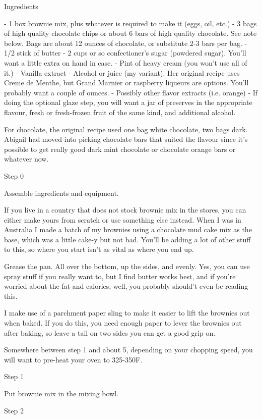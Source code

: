 Ingredients

- 1 box brownie mix, plus whatever is required to make it (eggs, oil, etc.)
- 3 bags of high quality chocolate chips or about 6 bars of high quality chocolate. See note below. Bags are about 12 ounces of chocolate, or substitute 2-3 bars per bag.
- 1/2 stick of butter
- 2 cups or so confectioner's sugar (powdered sugar). You'll want a little extra on hand in case.
- Pint of heavy cream (you won't use all of it.)
- Vanilla extract
- Alcohol or juice (my variant). Her original recipe uses Creme de Menthe, but Grand Marnier or raspberry liqueurs are options. You'll probably want a couple of ounces.
- Possibly other flavor extracts (i.e. orange)
- If doing the optional glaze step, you will want a jar of preserves in the appropriate flavour, fresh or fresh-frozen fruit of the same kind, and additional alcohol.

For chocolate, the original recipe used one bag white chocolate, two bags dark. Abigail had moved into picking chocolate bars that suited the flavour since it's possible to get really good dark mint chocolate or chocolate orange bars or whatever now.

Step 0

Assemble ingredients and equipment.

If you live in a country that does not stock brownie mix in the stores, you can either make yours from scratch or use something else instead. When I was in Australia I made a batch of my brownies using a chocolate mud cake mix as the base, which was a little cake-y but not bad. You'll be adding a lot of other stuff to this, so where you start isn't as vital as where you end up.

Grease the pan. All over the bottom, up the sides, and evenly. Yes, you can use spray stuff if you really want to, but I find butter works best, and if you're worried about the fat and calories, well, you probably should't even be reading this.

I make use of a parchment paper sling to make it easier to lift the brownies out when baked. If you do this, you need enough paper to lever the brownies out after baking, so leave a tail on two sides you can get a good grip on.

Somewhere between step 1 and about 5, depending on your chopping speed, you will want to pre-heat your oven to 325-350F.

Step 1

Put brownie mix in the mixing bowl.

Step 2

